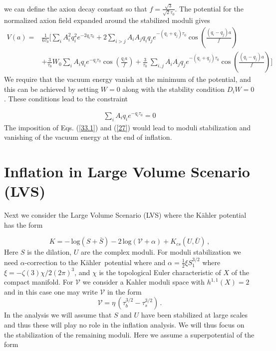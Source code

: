 \documentclass[12pt]{article}
\def\non{\nonumber\\}
\newcommand{\bl}[1]{{\color{blue}{#1}}}
\def\K{K\"ahler~}
\begin{document}
we can  define the axion decay constant  so that  $f=  \frac{\sqrt 3}{\sqrt 2 \tau_0}$.
The potential for the normalized axion field expanded around the stabilized moduli gives 
 \begin{align} 
V(a)= &\frac{1}{6\tau_0} \Big [  \sum_{i} A^2_i q^2_i  e^{- 2q_i \tau_0 } + 2 \sum_{i>j} A_iA_j q_iq_j e^{-(q_i+q_j)\tau_0} 
\cos\left(\frac{(q_i-q_j) a}{f}\right)\non
&+  \frac{3}{\tau_0}  W_0 \sum_i A_i q_i e^{-q_i \tau_0} \cos(\frac{q_i a}{f})
 +  \frac{3}{\tau_0} \ 
  \sum_{i,j}  A_i A_j q_j  e^{-(q_i + q_j) \tau_0} \cos\left(\frac{(q_i -q_j)a}{f}\right)
\Big]
\label{24}
\end{align}
We require that the vacuum energy vanish at the minimum of the potential, and this can be achieved by setting  $W=0$ along with the
stability condition $D_i W =0$.  These conditions lead to the constraint

\begin{align}
\sum_i A_i q_i e^{-q_i \tau_0}=0 
\label{27}
\end{align}
The imposition of Eqs. (\ref{33.1}) and (\ref{27}) would lead to moduli stabilization and 
vanishing of the vacuum energy at the end of  inflation. \\

 \bl{Max: Simulation part needs to be added here.}

\section{Inflation in Large Volume Scenario (LVS) \label{sec6}}

Next we consider the Large Volume Scenario (LVS) \cite{Balasubramanian:2005zx}
where  the K\"ahler potential has the form 

\begin{equation}
K =  - \, \text{log} (S+ \bar{S}) -2 \, \text{log} (\mathcal{V}  +\alpha) 
+ K_{cs} (U, \bar{U})  \, ,
\end{equation} 
Here $S$ is the dilation, $U$ are the complex moduli.  For moduli stabilization  we need  $\alpha$-correction to the \K potential where 
 and  $\alpha = \frac{1}{2} \xi S_1^{3/2}$ where  $\xi = -\zeta (3) \chi/2 (2\pi)^3$, and $\chi$ is the topological Euler characteristic  of $X$ of the compact manifold. For $\mathcal{V}$ we consider  a Kahler moduli space
with $h^{1,1}(X)=2$ and in this case one may write  $\mathcal{V}$ in the form 
\begin{equation}
\mathcal{V}  = \eta \,( \tau_b^{3/2} - \tau_s^{3/2}) \, .
\end{equation}
In the analysis we will  assume that  $S$ and $U$ have been stabilized at large scales and thus these will play no role in the 
inflation analysis.  We will thus focus on the stabilization of the remaining moduli.  Here we assume a superpotential of the form 
 
\end{document}
